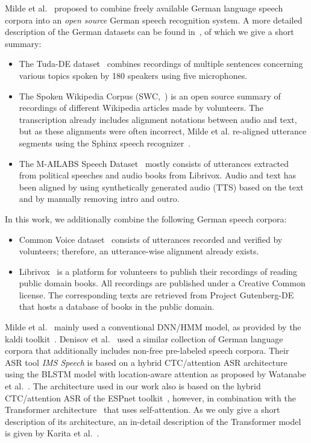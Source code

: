 \documentclass[runningheads]{llncs}
\begin{document}
Milde et al.~\cite{Milde2018} proposed to combine freely available German language speech corpora into an \emph{open source} German speech recognition system.
A more detailed description of the German datasets can be found in~\cite{Milde2018}, of which we give a short summary:
\begin{itemize}
    \item The Tuda-DE dataset~\cite{RadeckArneth2015} combines recordings of multiple sentences concerning various topics spoken by 180 speakers using five microphones.
    \item The Spoken Wikipedia Corpus (SWC,~\cite{Baumann2016}) is an open source summary of recordings of different Wikipedia articles made by volunteers.
    The transcription already includes alignment notations between audio and text, but as these alignments were often incorrect, Milde et al. re-aligned utterance segments using the Sphinx speech recognizer~\cite{Lamere2003}.
    \item The M-AILABS Speech Dataset~\cite{Solak2019} {mostly} consists of utterances extracted from political speeches and audio books from Librivox.
    Audio and text has been aligned by using synthetically generated audio (TTS) based on the text and by manually removing intro and outro.
\end{itemize}
In this work, we additionally combine the following German speech corpora:
\begin{itemize}
    \item Common Voice dataset~\cite{Ardila2019} consists of utterances recorded and verified by volunteers;
    therefore, an utterance-wise alignment already exists.
    \item Librivox~\cite{librivox} is a platform for volunteers to publish their recordings of reading public domain books.
    All recordings are published under a Creative Common license.
    The corresponding texts are retrieved from Project Gutenberg-DE~\cite{Gutenberg2019} that hosts a database of books in the public domain.
\end{itemize}
Milde et al.~\cite{Milde2018} mainly used a conventional DNN/HMM model, as provided by the kaldi toolkit~\cite{Povey2011}.
Denisov et al.~\cite{Denisov2019} used a similar collection of German language corpora that additionally includes non-free pre-labeled speech corpora.
Their ASR tool \emph{IMS Speech} is based on a hybrid CTC/attention ASR architecture using the BLSTM model with location-aware attention as proposed by Watanabe et al.~\cite{Watanabe2017}.
The architecture used in our work also is based on the hybrid CTC/attention ASR of the ESPnet toolkit~\cite{Watanabe2018},
however, in combination with the Transformer architecture~\cite{Vaswani2017} that uses self-attention.
As we only give a short description of its architecture, an in-detail description of the Transformer model is given by Karita et al.~\cite{Karita2019}.
\end{document}
